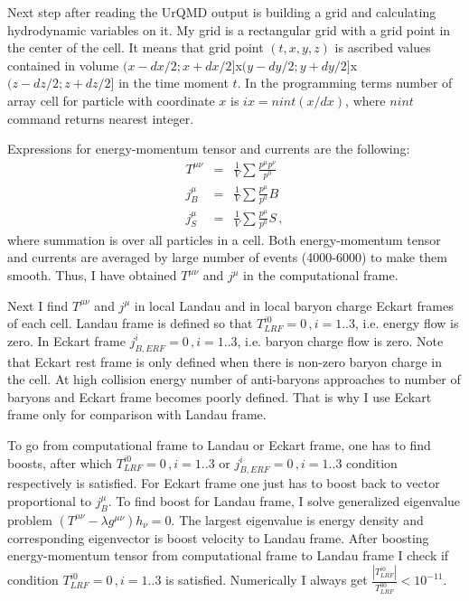 \documentclass[12pt,a4paper]{report}
\begin{document}
Next step after reading the UrQMD output is building a grid and calculating hydrodynamic variables on it. My grid is a rectangular grid with a grid point in the center of the cell. It means that grid point $(t,x,y,z)$ is ascribed values contained in volume $(x-dx/2; x+dx/2]$x$(y-dy/2; y+dy/2]$x$(z-dz/2; z+dz/2]$ in the time moment $t$. In the programming terms number of array cell for particle with coordinate $x$ is $ix = nint(x/dx)$, where $nint$ command returns nearest integer.

Expressions for energy-momentum tensor and currents are the following:
\begin{eqnarray}
T^{\mu \nu} &=&\frac{1}{V} \sum \frac{p^{\mu}p^{\nu}}{p^0} \\
j^{\mu}_B &=& \frac{1}{V} \sum \frac{p^{\mu}}{p^0} B \\
j^{\mu}_S &=& \frac{1}{V} \sum \frac{p^{\mu}}{p^0} S \,,
\end{eqnarray}
where summation is over all particles in a cell. Both energy-momentum tensor and currents are averaged by large number of events (4000-6000) to make them smooth. Thus, I have obtained $T^{\mu \nu}$ and $j^{\mu}$ in the computational frame. 

Next I find $T^{\mu \nu}$ and $j^{\mu}$ in local Landau and in local baryon charge Eckart frames of each cell. Landau frame is defined so that $T^{i 0}_{LRF} = 0\,, i=1..3$, i.e. energy flow is zero. In Eckart frame $j^i_{B, ERF} = 0\,, i=1..3$, i.e. baryon charge flow is zero. Note that Eckart rest frame is only defined when there is non-zero baryon charge in the cell. At high collision energy number of anti-baryons approaches to number of baryons and Eckart frame becomes poorly defined. That is why I use Eckart frame only for comparison with Landau frame.

To go from computational frame to Landau or Eckart frame, one has to find boosts, after which $T^{i 0}_{LRF} = 0\,, i=1..3$ or $j^i_{B, ERF} = 0\,, i=1..3$ condition respectively is satisfied. For Eckart frame one just has to boost back to vector proportional to $j^{\mu}_B$. To find boost for Landau frame, I solve generalized eigenvalue problem $(T^{\mu \nu} - \lambda g^{\mu \nu}) h_{\nu} = 0$. The largest eigenvalue is energy density and corresponding eigenvector is boost velocity to Landau frame. After boosting energy-momentum tensor from computational frame to Landau frame I check if condition $T^{i 0}_{LRF} = 0\,, i=1..3$ is satisfied. Numerically I always get $\frac{|T^{i 0}_{LRF}|}{T^{00}_{LRF}} < 10^{-11}$.
\end{document}

